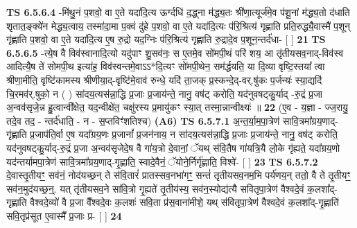 \documentclass[17pt]{extarticle}
\begin{document}
                  \newline
                                \textbf{ TS 6.5.6.4} \newline
                  -मि॑थु॒नं प॒शवो॒ वा ए॒ते यदा॑दि॒त्य ऊर्ग्दधि॑ द॒द्ध्ना म॑द्ध्य॒तः श्री॑णा॒त्यूर्ज॑मे॒व प॑शू॒नां म॑द्ध्य॒तो द॑धाति शृतात॒ङ्क्ये॑न मेद्ध्य॒त्वाय॒ तस्मा॑दा॒मा प॒क्वं दु॑हे प॒शवो॒ वा ए॒ते यदा॑दि॒त्यः प॑रि॒श्रित्य॑ गृह्णाति प्रति॒रुद्ध्यै॒वास्मै॑ प॒शून् गृ॑ह्णाति प॒शवो॒ वा ए॒ते यदा॑दि॒त्य ए॒ष रु॒द्रो यद॒ग्निः प॑रि॒श्रित्य॑ गृह्णाति रु॒द्रादे॒व प॒शून॒न्तर्द॑धा- [  ] \textbf{  21} \newline
                  \newline
                                \textbf{ TS 6.5.6.5} \newline
                  -त्ये॒ष वै विव॑स्वानादि॒त्यो यदु॑पाꣳ शु॒सव॑नः॒ स ए॒तमे॒व सो॑मपी॒थं परि॑ शय॒ आ तृ॑तीयसव॒नाद्-विव॑स्व आदित्यै॒ष ते॑ सोमपी॒थ इत्या॑ह॒ विव॑स्वन्तमे॒वाऽऽ*दि॒त्यꣳ सो॑मपी॒थेन॒ सम॑र्द्धयति॒ या दि॒व्या वृष्टि॒स्तया᳚ त्वा श्रीणा॒मीति॒ वृष्टि॑कामस्य श्रीणीया॒द्-वृष्टि॑मे॒वाव॑ रुन्धे॒ यदि॑ ता॒जक् प्र॒स्कन्दे॒द्-वर्.षु॑कः प॒र्जन्यः॑ स्या॒द्यदि॑ चि॒रमव॑र्.षुको॒ न ( ) सा॑दय॒त्यस॑न्ना॒द्धि प्र॒जाः प्र॒जाय॑न्ते॒ नानु॒ वष॑ट् करोति॒ यद॑नुवषट्कु॒र्याद् -रु॒द्रं प्र॒जा अ॒न्वव॑सृजे॒न्न हु॒त्वान्वी᳚क्षेत॒ यद॒न्वीक्षे॑त॒ चक्षु॑रस्य प्र॒मायु॑कꣳ स्या॒त् तस्मा॒न्नान्वीक्ष्यः॑ ॥ \textbf{  22} \newline
                  \newline
                      (ए॒व - य॒ज्ञा - ज्ज॒रायु॒ तदे॒व तद॒ - न्तर्द॑धाति॒ - न - स॒प्तविꣳ॑शतिश्च)  \textbf{(A6)} \newline \newline
                                        \textbf{ TS 6.5.7.1} \newline
                  अ॒न्त॒र्या॒म॒पा॒त्रेण॑ सावि॒त्रमा᳚ग्रय॒णाद्-गृ॑ह्णाति प्र॒जाप॑ति॒र्वा ए॒ष यदा᳚ग्रय॒णः प्र॒जानां᳚ प्र॒जन॑नाय॒ न सा॑दय॒त्यस॑न्ना॒द्धि प्र॒जाः प्र॒जाय॑न्ते॒ नानु॒ वष॑ट् करोति॒ यद॑नुवषट्कु॒र्याद्-रु॒द्रं प्र॒जा अ॒न्वव॑सृजेदे॒ष वै गा॑य॒त्रो दे॒वानां॒ ॅयथ् स॑वि॒तैष गा॑यत्रि॒यै लो॒के गृ॑ह्यते॒ यदा᳚ग्रय॒णो यद॑न्तर्यामपा॒त्रेण॑ सावि॒त्रमा᳚ग्रय॒णाद्-गृ॒ह्णाति॒ स्वादे॒वैनं॒ ॅयोने॒र्निर्गृ॑ह्णाति॒ विश्वे॑- [  ] \textbf{  23} \newline
                  \newline
                                \textbf{ TS 6.5.7.2} \newline
                  दे॒वास्तृ॒तीयꣳ॒॒ सव॑नं॒ नोद॑यच्छ॒न् ते स॑वि॒तारं॑ प्रातस्सव॒नभा॑गꣳ॒॒ सन्तं॑ तृतीयसव॒नम॒भि पर्य॑णय॒न् ततो॒ वै ते तृ॒तीयꣳ॒॒ सव॑न॒मुद॑यच्छ॒न्॒. यत् तृ॑तीयसव॒ने सा॑वि॒त्रो गृ॒ह्यते॑ तृ॒तीय॑स्य॒ सव॑न॒स्योद्य॑त्यै सवितृपा॒त्रेण॑ वैश्वदे॒वं क॒लशा᳚द्-गृह्णाति वैश्वदे॒व्यो॑ वै प्र॒जा वै᳚श्वदे॒वः क॒लशः॑ सवि॒ता प्र॑स॒वाना॑मीशे॒ यथ् स॑वितृपा॒त्रेण॑ वैश्वदे॒वं क॒लशा᳚द्-गृ॒ह्णाति॑ सवि॒तृप्र॑सूत ए॒वास्मै᳚ प्र॒जाः प्र- [  ] \textbf{  24} \newline
\end{document}

